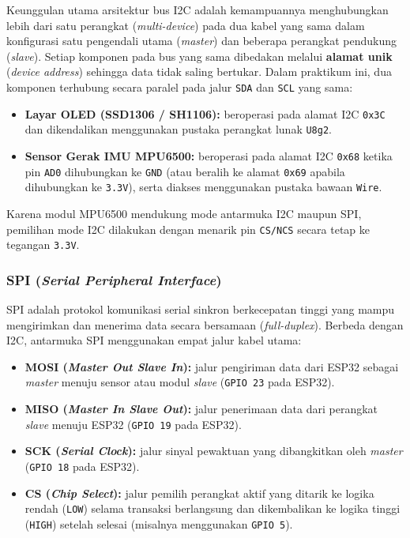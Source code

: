 Keunggulan utama arsitektur bus I2C adalah kemampuannya menghubungkan lebih dari satu perangkat (\textit{multi-device}) pada dua kabel yang sama dalam konfigurasi satu pengendali utama (\textit{master}) dan beberapa perangkat pendukung (\textit{slave}). Setiap komponen pada bus yang sama dibedakan melalui \textbf{alamat unik} (\textit{device address}) sehingga data tidak saling bertukar. Dalam praktikum ini, dua komponen terhubung secara paralel pada jalur \texttt{SDA} dan \texttt{SCL} yang sama:
\begin{itemize}
    \item \textbf{Layar OLED (SSD1306 / SH1106):} beroperasi pada alamat I2C \texttt{0x3C} dan dikendalikan menggunakan pustaka perangkat lunak \texttt{U8g2}.
    \item \textbf{Sensor Gerak IMU MPU6500:} beroperasi pada alamat I2C \texttt{0x68} ketika pin \texttt{AD0} dihubungkan ke \texttt{GND} (atau beralih ke alamat \texttt{0x69} apabila dihubungkan ke \texttt{3.3V}), serta diakses menggunakan pustaka bawaan \texttt{Wire}.
\end{itemize}
Karena modul MPU6500 mendukung mode antarmuka I2C maupun SPI, pemilihan mode I2C dilakukan dengan menarik pin \texttt{CS/NCS} secara tetap ke tegangan \texttt{3.3V}.

\subsubsection{SPI (\textit{Serial Peripheral Interface})}
SPI adalah protokol komunikasi serial sinkron berkecepatan tinggi yang mampu mengirimkan dan menerima data secara bersamaan (\textit{full-duplex}). Berbeda dengan I2C, antarmuka SPI menggunakan empat jalur kabel utama:
\begin{itemize}
    \item \textbf{MOSI (\textit{Master Out Slave In}):} jalur pengiriman data dari ESP32 sebagai \textit{master} menuju sensor atau modul \textit{slave} (\texttt{GPIO 23} pada ESP32).
    \item \textbf{MISO (\textit{Master In Slave Out}):} jalur penerimaan data dari perangkat \textit{slave} menuju ESP32 (\texttt{GPIO 19} pada ESP32).
    \item \textbf{SCK (\textit{Serial Clock}):} jalur sinyal pewaktuan yang dibangkitkan oleh \textit{master} (\texttt{GPIO 18} pada ESP32).
    \item \textbf{CS (\textit{Chip Select}):} jalur pemilih perangkat aktif yang ditarik ke logika rendah (\texttt{LOW}) selama transaksi berlangsung dan dikembalikan ke logika tinggi (\texttt{HIGH}) setelah selesai (misalnya menggunakan \texttt{GPIO 5}).
\end{itemize}

